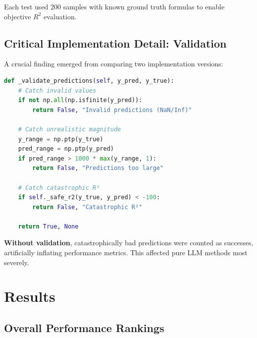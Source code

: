\documentclass[11pt,a4paper]{article}
\begin{document}
Each test used 200 samples with known ground truth formulas to enable objective $R^2$ evaluation.

\subsection{Critical Implementation Detail: Validation}

A crucial finding emerged from comparing two implementation versions:

\begin{lstlisting}[language=Python, caption=Essential Validation Logic]
def _validate_predictions(self, y_pred, y_true):
    # Catch invalid values
    if not np.all(np.isfinite(y_pred)):
        return False, "Invalid predictions (NaN/Inf)"

    # Catch unrealistic magnitude
    y_range = np.ptp(y_true)
    pred_range = np.ptp(y_pred)
    if pred_range > 1000 * max(y_range, 1):
        return False, "Predictions too large"

    # Catch catastrophic R²
    if self._safe_r2(y_true, y_pred) < -100:
        return False, "Catastrophic R²"

    return True, None
\end{lstlisting}

\textbf{Without validation}, catastrophically bad predictions were counted as successes, artificially inflating performance metrics. This affected pure LLM methods most severely.

\section{Results}

\subsection{Overall Performance Rankings}
\end{document}
